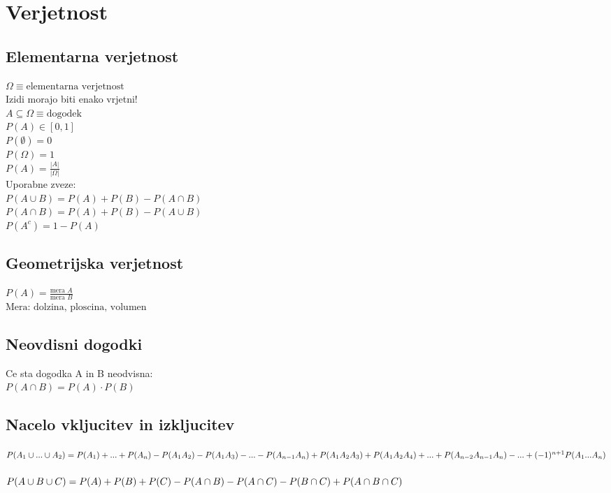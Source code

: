 \section{Verjetnost}

\subsection{Elementarna verjetnost}
$\Omega \equiv\text{elementarna verjetnost}$\\
Izidi morajo biti enako vrjetni!\\
$A \subseteq \Omega \equiv\text{dogodek}$\\ 
$P(A)\in [0, 1]$\\
$P(\emptyset)=0$\\
$P(\Omega)=1$\\
$P(A)=\frac{|A|}{|\Omega|}$\\
Uporabne zveze:\\
$P(A\cup B)=P(A)+P(B)-P(A\cap B)$\\
$P(A\cap B)=P(A)+P(B)-P(A\cup B)$\\
$P(A^c)=1-P(A)$\\


\subsection{Geometrijska verjetnost}
$P(A)=\frac{\text{mera }A}{\text{mera }B}$\\
$\text{Mera: dolzina, ploscina, volumen}$\\

\subsection{Neovdisni dogodki}
Ce sta dogodka A in B neodvisna:\\
$P(A\cap B)=P(A)\cdot P(B)$\\

\subsection{Nacelo vkljucitev in izkljucitev}
$P(A_1\cup ... \cup A_2)=P(A_1)+...+P(A_n)\\-P(A_1A_2)-P(A_1A_3)-...-P(A_{n-1}A_n)\\+P(A_1A_2A_3)+P(A_1A_2A_4)+...+P(A_{n-2}A_{n-1}A_n)\\-...\\+(-1)^{n+1}P(A_1...A_n)$\\
\\
$P(A\cup B \cup C)=\\P(A)+P(B)+P(C)\\-P(A\cap B)-P(A\cap C)-P(B\cap C)\\+P(A\cap B\cap C)$\\
